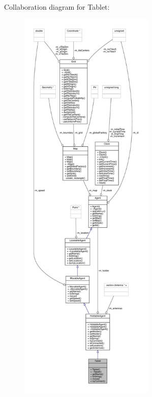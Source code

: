 Collaboration diagram for Tablet\+:\nopagebreak
\begin{figure}[H]
\begin{center}
\leavevmode
\includegraphics[height=550pt]{class_tablet__coll__graph}
\end{center}
\end{figure}
